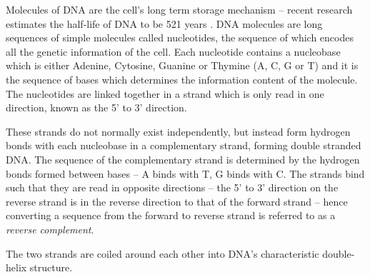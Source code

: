 Molecules of DNA are the cell's long term storage mechanism -- recent research
estimates the half-life of DNA to be 521 years \citep{DNAhalflife}.
DNA molecules are long sequences of simple molecules called nucleotides, the
sequence of  which encodes all the genetic information of the cell.
Each nucleotide contains a nucleobase which is either Adenine, Cytosine, 
Guanine or Thymine (A, C, G or T) and it is the sequence of bases 
which determines the information content of the molecule.
The nucleotides are linked together in a strand which is only read in one 
direction, known as the 5' to 3' direction.

These strands do not normally exist independently, but instead form hydrogen
bonds with each nucleobase in a complementary strand, forming double stranded
DNA.
The sequence of the complementary strand is determined by the hydrogen bonds
formed between bases -- A binds with T, G binds with C.
The strands bind such that they are read in opposite directions -- the 5' to 3' 
direction on the reverse strand is in the reverse direction to that of the 
forward strand -- hence converting a sequence from the
forward to reverse strand is referred to as a \emph{reverse complement}.

The two strands are coiled around each other into DNA's characteristic 
double-helix structure.

